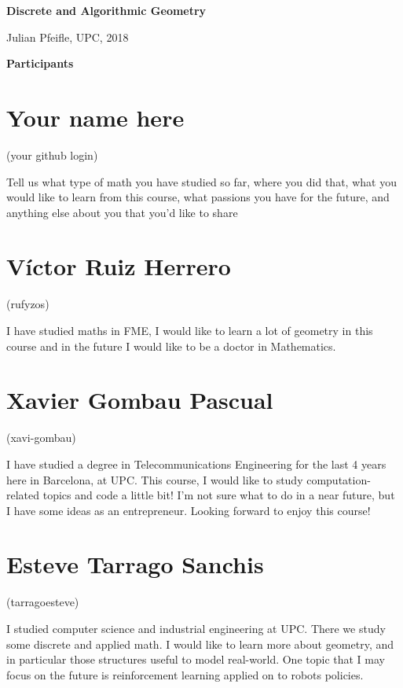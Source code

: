 \documentclass[11pt]{amsart}
\begin{document}
\begin{center}
\textbf{\sffamily
   Discrete and Algorithmic Geometry }

\medskip
   Julian Pfeifle,
   UPC, 2018
\end{center}

\bigskip

\begin{center}
  \textbf{\sffamily Participants}
\end{center}

\medskip

\section*{Your name here}
(your github login)

Tell us what type of math you have studied so far, where you did that, what you would like to learn from this course, what passions you have for the future, and anything else about you that you'd like to share

\medskip

\section*{Víctor Ruiz Herrero}
(rufyzos)

I  have  studied  maths  in  FME,  I  would  like  to  learn  a  lot  of  geometry  in  this course and in the future I would like to be a doctor in Mathematics.

\medskip

\section*{Xavier Gombau Pascual}
(xavi-gombau)

I have studied a degree in Telecommunications Engineering for the last 4 years here in Barcelona, at UPC. This course, I would like to study computation-related topics and code a little bit! I'm not sure what to do in a near future, but I have some ideas as an entrepreneur. Looking forward to enjoy this course! 

\medskip

\section*{Esteve Tarrago Sanchis}
(tarragoesteve)

I  studied computer science and industrial engineering at UPC. There we study some discrete and applied math. I would like to learn more about geometry, and in particular those structures useful to model real-world. One topic that I may focus on the future is reinforcement learning applied on to robots policies. 
\end{document}
